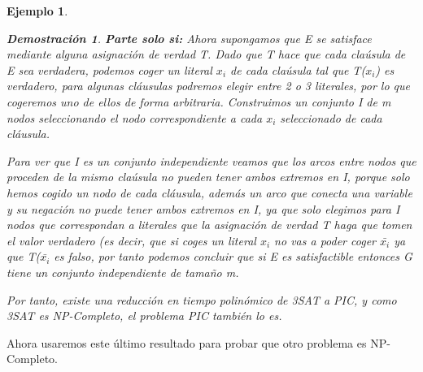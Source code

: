 \documentclass[a4paper,12pt,titlepage]{article}
\newtheorem{eje}{Ejemplo}[section]
\newtheorem*{dem}{\textbf{Demostraci\'on}}
\begin{document}
\begin{eje}
\begin{dem}
\vspace{\baselineskip}

\textbf{Parte solo si:} Ahora supongamos que E se satisface mediante alguna asignaci\'on de verdad T. Dado que T hace que cada cla\'usula de E sea verdadera, podemos coger un literal $x_i$ de cada cla\'usula tal que T($x_i$) es verdadero, para algunas cl\'ausulas podremos elegir entre 2 o 3 literales, por lo que cogeremos uno de ellos de forma arbitraria. Construimos un conjunto I de m nodos seleccionando el nodo correspondiente a cada $x_i$ seleccionado de cada cl\'ausula.

\vspace{\baselineskip}

Para ver que I es un conjunto independiente veamos que los arcos entre nodos que proceden de la mismo cla\'usula no pueden tener ambos extremos en I, porque solo hemos cogido un nodo de cada cl\'ausula, adem\'as un arco que conecta una variable y su negaci\'on no puede tener ambos extremos en I, ya que solo elegimos para I nodos que correspondan a literales que la asignaci\'on de verdad T haga que tomen el valor verdadero (es decir, que si coges un literal $x_i$ no vas a poder coger $\bar{x_i}$ ya que T($\bar{x_i}$ es falso, por tanto podemos concluir que si E es satisfactible entonces G tiene un conjunto independiente de tamaño m.

Por tanto, existe una reducci\'on en tiempo polin\'omico de 3SAT a PIC, y como 3SAT es NP-Completo\cite{HopcroftESP}, el problema PIC tambi\'en lo es.

\end{dem}

\end{eje}

Ahora usaremos este \'ultimo resultado para probar que otro problema es NP-Completo.
\end{document}
